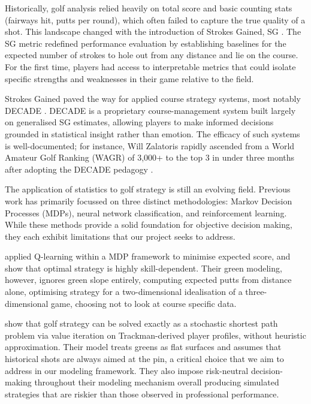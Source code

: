 \documentclass[11pt, letterpaper]{article}
\begin{document}
Historically, golf analysis relied heavily on total score and basic counting stats (fairways hit, putts per round), which often failed to capture the true quality of a shot. This landscape changed with the introduction of Strokes Gained, SG \parencite{Broadie_2014a}. The SG metric redefined performance evaluation by establishing baselines for the expected number of strokes to hole out from any distance and lie on the course. For the first time, players had access to interpretable metrics that could isolate specific strengths and weaknesses in their game relative to the field.

Strokes Gained paved the way for applied course strategy systems, most notably DECADE \parencite{decade_golf}. DECADE is a proprietary course-management system built largely on generalised SG estimates, allowing players to make informed decisions grounded in statistical insight rather than emotion. The efficacy of such systems is well-documented; for instance, Will Zalatoris rapidly ascended from a World Amateur Golf Ranking (WAGR) of 3,000+ to the top 3 in under three months after adopting the DECADE pedagogy \parencite{decade_golf}.

The application of statistics to golf strategy is still an evolving field. Previous work has primarily focussed on three distinct methodologies: Markov Decision Processes (MDPs), neural network classification, and reinforcement learning. While these methods provide a solid foundation for objective decision making, they each exhibit limitations that our project seeks to address.


\textcite{sugawara_skill-based_2013} applied Q-learning within a MDP framework to minimise expected score, and show that optimal strategy is highly skill-dependent. Their green modeling, however, ignores green slope entirely, computing expected putts from distance alone, optimising strategy for a two-dimensional idealisation of a three-dimensional game, choosing not to look at course specific data. 

\textcite{stauffer_golf_2025} show that golf strategy can be solved exactly as a stochastic shortest path problem via value iteration on Trackman-derived player profiles, without heuristic approximation. Their model treats greens as flat surfaces and assumes that historical shots are always aimed at the pin, a critical choice that we aim to address in our modeling framework. They also impose risk-neutral decision-making throughout their modeling mechanism overall producing simulated strategies that are riskier than those observed in professional performance. 
\end{document}

